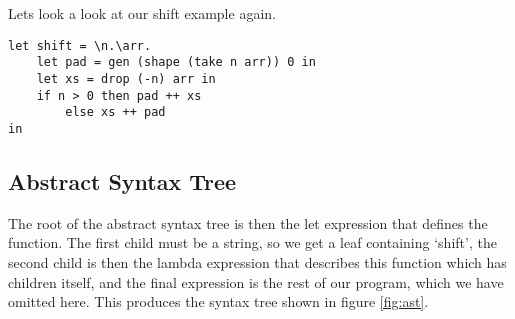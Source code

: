 \documentclass[../main.tex]{subfiles}
\begin{document}
Lets look a look at our shift example again.
\begin{verbatim}
let shift = \n.\arr.
    let pad = gen (shape (take n arr)) 0 in
    let xs = drop (-n) arr in
    if n > 0 then pad ++ xs
        else xs ++ pad
in
\end{verbatim}

\subsection{Abstract Syntax Tree}
The root of the abstract syntax tree is then the let expression that defines the function. The first child must be a string, so we get a leaf containing `shift', the second child is then the lambda expression that describes this function which has children itself, and the final expression is the rest of our program, which we have omitted here. This produces the syntax tree shown in figure \ref{fig:ast}.
\end{document}
